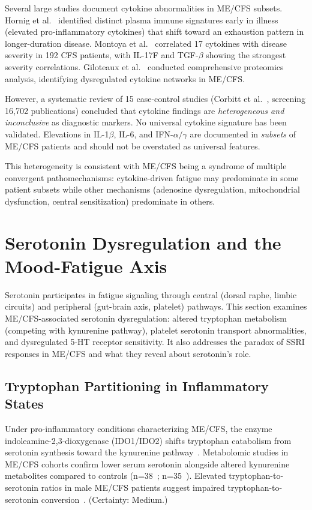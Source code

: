 Several large studies document cytokine abnormalities in ME/CFS subsets. Hornig et al.~\cite{Hornig2015} identified distinct plasma immune signatures early in illness (elevated pro-inflammatory cytokines) that shift toward an exhaustion pattern in longer-duration disease. Montoya et al.~\cite{Montoya2017} correlated 17 cytokines with disease severity in 192 CFS patients, with IL-17F and TGF-$\beta$ showing the strongest severity correlations. Giloteaux et al.~\cite{Giloteaux2023} conducted comprehensive proteomics analysis, identifying dysregulated cytokine networks in ME/CFS.

However, a systematic review of 15 case-control studies (Corbitt et al.~\cite{Corbitt2019}, screening 16,702 publications) concluded that cytokine findings are \emph{heterogeneous and inconclusive} as diagnostic markers. No universal cytokine signature has been validated. Elevations in IL-1$\beta$, IL-6, and IFN-$\alpha/\gamma$ are documented in \emph{subsets} of ME/CFS patients and should not be overstated as universal features.

This heterogeneity is consistent with ME/CFS being a syndrome of multiple convergent pathomechanisms: cytokine-driven fatigue may predominate in some patient subsets while other mechanisms (adenosine dysregulation, mitochondrial dysfunction, central sensitization) predominate in others.


\section{Serotonin Dysregulation and the Mood-Fatigue Axis}
\label{sec:ch15-serotonin}

Serotonin participates in fatigue signaling through central (dorsal raphe, limbic circuits) and peripheral (gut-brain axis, platelet) pathways. This section examines ME/CFS-associated serotonin dysregulation: altered tryptophan metabolism (competing with kynurenine pathway), platelet serotonin transport abnormalities, and dysregulated 5-HT receptor sensitivity. It also addresses the paradox of SSRI responses in ME/CFS and what they reveal about serotonin's role.

\subsection{Tryptophan Partitioning in Inflammatory States}

\begin{observation}
\label{obs:ch15-trp-partitioning}
Under pro-inflammatory conditions characterizing ME/CFS, the enzyme indoleamine-2,3-dioxygenase (IDO1/IDO2) shifts tryptophan catabolism from serotonin synthesis toward the kynurenine pathway~\cite{Kavyani2022kynurenine,Dehhaghi2022kynurenine}. Metabolomic studies in ME/CFS cohorts confirm lower serum serotonin alongside altered kynurenine metabolites compared to controls (n=38~\cite{Abujrais2024tryptophan}; n=35~\cite{Simonato2021tryptophan}). Elevated tryptophan-to-serotonin ratios in male ME/CFS patients suggest impaired tryptophan-to-serotonin conversion~\cite{Abujrais2024tryptophan}. (Certainty: Medium.)
\end{observation}

